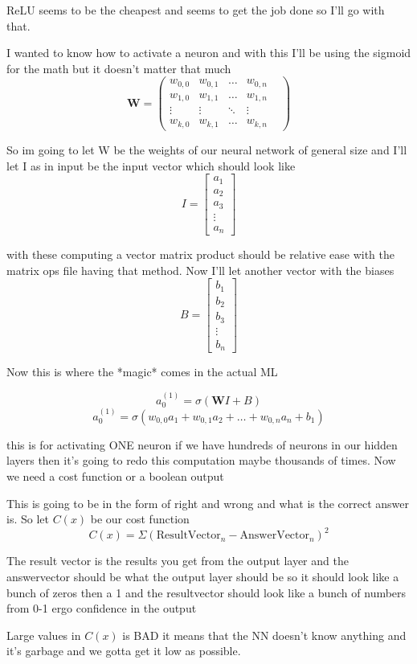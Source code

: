 \documentclass{article}
\begin{document}
\par{ReLU seems to be the cheapest and seems to get the job done so I'll go with that. }
\par{I wanted to know how to activate a neuron and with this I'll be using the sigmoid for the math but it doesn't matter that much}
$$\mathbf{W} = \begin{pmatrix}
    w_{0,0} & w_{0,1} & \dots & w_{0,n} \\
    w_{1,0} & w_{1,1} & \dots & w_{1,n} \\
    \vdots  & \vdots & \ddots & \vdots \\
    w_{k,0} & w_{k,1} & \dots & w_{k,n} &  
\end{pmatrix}$$
\par{So im going to let W be the weights of our neural network of general size and I'll let I as in input be the input vector which should look like}
$$I = \begin{bmatrix}
    a_{1} \\
    a_{2} \\
    a_{3} \\
    \vdots \\
    a_{n}
\end{bmatrix}$$
\par{with these computing a vector matrix product should be relative ease with the matrix ops file having that method.
Now I'll let another vector with the biases}
$$
B = \begin{bmatrix}
    b_{1} \\
    b_{2} \\
    b_{3} \\
    \vdots \\
    b_{n}
\end{bmatrix}
$$
\par{Now this is where the *magic* comes in the actual ML}

$$a_0^{(1)}=\sigma(\mathbf{W}I+B)$$
$$ a_0^{(1)} = \sigma(w_{0,0}a_{1} + w_{0,1}a_{2} + \dots + w_{0,n}a_{n} +b_{1})$$
\par{this is for activating ONE neuron if we have hundreds of neurons in our hidden layers
then it's going to redo this computation maybe thousands of times. Now we need a cost function or a boolean output}
\\
\par{This is going to be in the form of right and wrong and what is the correct answer is. So let $C(x)$ be our cost function}
$$C(x) = \Sigma(\text{ResultVector}_n - \text{AnswerVector}_n)^2$$
\par{The result vector is the results you get from the output layer and the answervector should be what the output layer should be so it should look like
a bunch of zeros then a 1 and the resultvector should look like a bunch of numbers from 0-1 ergo confidence in the output}
\\
\par{Large values in $C(x)$ is BAD it means that the NN doesn't know anything and it's garbage and we gotta get it low as possible.}
\end{document}
